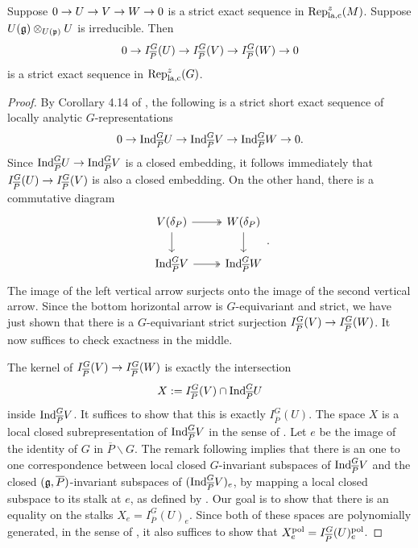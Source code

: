 \documentclass[10pt]{amsart}
\begin{document}
\begin{theorem}\label{thm:exact_IpG}
Suppose $0 \rightarrow U \rightarrow V \rightarrow W \rightarrow 0$ is a strict exact sequence in $\textnormal{Rep}_{\textnormal{la,c}}^{z}(M)$. Suppose $U(\mathfrak{g})\otimes_{U(\mathfrak{p})}U$ is irreducible. Then \begin{equation*}
    0 \rightarrow I_{\overline{P}}^{G}(U) \rightarrow I_{\overline{P}}^{G}(V) \rightarrow I_{\overline{P}}^{G}(W) \rightarrow 0
\end{equation*} is a strict exact sequence in $\textnormal{Rep}_{\textnormal{la,c}}^{z}(G)$. 
\end{theorem}
\begin{proof}
By Corollary 4.14 of \cite{Schraen}, the following is a strict short exact sequence of locally analytic $G$-representations \begin{equation}\label{eqn:ind_exact}
    0 \rightarrow \textnormal{Ind}_{\overline{P}}^{G} U \rightarrow \textnormal{Ind}_{\overline{P}}^{G}V \rightarrow \textnormal{Ind}_{\overline{P}}^{G} W \rightarrow 0.
\end{equation}
Since $\textnormal{Ind}_{\overline{P}}^{G} U \rightarrow \textnormal{Ind}_{\overline{P}}^{G}V$ is a closed embedding, it follows immediately that $I_{\overline{P}}^{G}(U) \rightarrow I_{\overline{P}}^{G}(V)$ is also a closed embedding. On the other hand, there is a commutative diagram \begin{equation}
\begin{tikzcd}
    V(\delta_{P}) \arrow[r,two heads] \arrow[d] & W(\delta_{P}) \arrow[d] \\
	\ind_{\overline{P}}^{G}V \arrow[r, two heads] & \ind_{\overline{P}}^{G}W
\end{tikzcd}.
\end{equation}
The image of the left vertical arrow surjects onto the image of the second vertical arrow. Since the bottom horizontal arrow is $G$-equivariant and strict, we have just shown that there is a $G$-equivariant strict surjection $I_{\overline{P}}^{G}(V) \rightarrow I_{\overline{P}}^{G}(W)$. It now suffices to check exactness in the middle. 

The kernel of $I_{\overline{P}}^{G}(V) \rightarrow I_{\overline{P}}^{G}(W)$ is exactly the intersection \begin{equation}
    X := I_{\overline{P}}^{G}(V) \cap \textnormal{Ind}_{\overline{P}}^{G} U
\end{equation} inside $\textnormal{Ind}_{\overline{P}}^{G} V$. It suffices to show that this is exactly $I_{\overline{P}}^{G}(U)$. The space $X$ is a local closed subrepresentation of $\textnormal{Ind}_{\overline{P}}^{G} V$ in the sense of \cite[Def. 2.4.1]{Jacquet2}. Let $e$ be the image of the identity of $G$ in $\overline{P}\backslash G$. The remark following \cite[Prop. 2.4.9]{Jacquet2} implies that there is an one to one correspondence between local closed $G$-invariant subspaces of $\textnormal{Ind}_{\overline{P}}^{G} V$ and the closed $(\mathfrak{g},\overline{P})$-invariant subspaces of $(\textnormal{Ind}_{\overline{P}}^{G} V)_{e}$, by mapping a local closed subspace to its stalk at $e$, as defined by \cite[Def. 2.4.2]{Jacquet2}. Our goal is to show that there is an equality on the stalks $X_{e}=I_{\overline{P}}^{G}(U)_{e}$. Since both of these spaces are polynomially generated, in the sense of \cite[Def. 2.7.15]{Jacquet2}, it also suffices to show that $X_{e}^{\textnormal{pol}}=I_{\overline{P}}^{G}(U)_{e}^{\textnormal{pol}}$. 


\end{proof}
\end{document}
